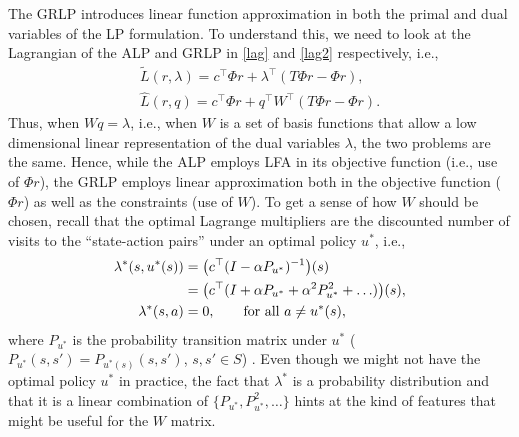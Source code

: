 The GRLP introduces linear function approximation in both the primal and dual variables of the LP formulation. 
To understand this, we need to look at the Lagrangian of the ALP and GRLP in 
\eqref{lag} and \eqref{lag2} respectively, i.e., 
\begin{align}\label{lag}
\tilde{L}(r,\lambda)=c^\top \Phi r+\lambda^\top (T\Phi r-\Phi r), \\ \label{lag2}\hat{L}(r,q)=c^\top \Phi r+q^\top W^\top (T\Phi r-\Phi r).
\end{align}
Thus, when $Wq = \lambda$, i.e., when $W$ is a set of basis functions that allow
a low dimensional linear representation of the dual variables $\lambda$,
the two problems are the same.
Hence, while the ALP employs LFA in its objective function (i.e., use of $\Phi r$), the GRLP employs linear approximation both in the objective function ($\Phi r$) as well as the constraints (use of $W$). 
To get a sense of how $W$ should be chosen, recall that
the optimal Lagrange multipliers are the discounted number of visits to the ``state-action pairs'' under an optimal policy $u^*$, i.e., 
\begin{align}
\lambda^*(s,u^*(s))&=\big(c^\top(I-\alpha P_{u^*})^{-1}\big)(s)\nonumber\\
				&= \big(c^\top(I+\alpha P_{u^*}+\alpha^2 P_{u^*}^2+\ldots)\big)(s),\nonumber\\
			\lambda^*(s,a)&=0, \qquad \text{for all } a \neq u^*(s),\nonumber
\end{align}
where $P_{u^*}$ is the probability transition matrix under $u^*$ ($P_{u^*}(s,s') = P_{u^*(s)}(s,s')$, $s,s'\in S$) \cite{dolgov}. Even though we might not have the optimal policy $u^*$ in practice, the fact that $\lambda^*$ is a probability distribution and that it is a linear combination of $\{P_{u^*},P^2_{u^*},\ldots\}$ hints at the kind of features that might be useful for the $W$ matrix.
